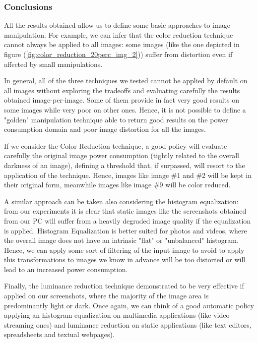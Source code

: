 \documentclass[a4paper]{article}
\begin{document}
        \subsubsection{Conclusions}
        All the results obtained allow us to define some basic approaches to image manipulation. For example, we can infer that the color reduction technique cannot always be applied to all images: some images (like the one depicted in figure (\ref{fig:color_reduction_20perc_img_2})) suffer from distortion even if affected by small manipulations.

        In general, all of the three techniques we tested cannot be applied by default on all images without exploring the tradeoffs and evaluating carefully the results obtained image-per-image. Some of them provide in fact very good results on some images while very poor on other ones.
        Hence, it is not possible to define a "golden" manipulation technique able to return good results on the power consumption domain and poor image distortion for all the images.

        If we consider the Color Reduction technique, a good policy will evaluate carefully the original image power consumption (tightly related to the overall darkness of an image), defining a threshold that, if surpassed, will resort to the application of the technique. Hence, images like image \#1 and \#2 will be kept in their original form, meanwhile images like image \#9 will be color reduced.

        A similar approach can be taken also considering the histogram equalization: from our experiments it is clear that static images like the screenshots obtained from our PC will suffer from a heavily degraded image quality if the equalization is applied. Histogram Equalization is better suited for photos and videos, where the overall image does not have an intrinsic "flat" or "unbalanced" histogram. Hence, we can apply some sort of filtering of the input image to avoid to apply this transformations to images we know in advance will be too distorted or will lead to an increased power consumption.

        Finally, the luminance reduction technique demonstrated to be very effective if applied on our screenshots, where the majority of the image area is predominantly light or dark.
        Once again, we can think of a good automatic policy applying an histogram equalization on multimedia applications (like video-streaming ones) and luminance reduction on static applications (like text editors, spreadsheets and textual webpages).
\end{document}
